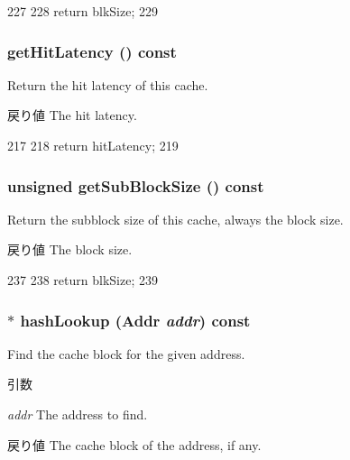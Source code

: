\begin{DoxyCode}
227     {
228         return blkSize;
229     }
\end{DoxyCode}
\hypertarget{classFALRU_a0239f3ef0ba6cf7c0460b12d289e6517}{
\subsubsection[{getHitLatency}]{ getHitLatency () const}}
\label{classFALRU_a0239f3ef0ba6cf7c0460b12d289e6517}
Return the hit latency of this cache. \begin{DoxyReturn}{戻り値}
The hit latency. 
\end{DoxyReturn}



\begin{DoxyCode}
217     {
218         return hitLatency;
219     }
\end{DoxyCode}
\hypertarget{classFALRU_aca3769c95ef908ce22475a69f8929a32}{
\subsubsection[{getSubBlockSize}]{\setlength{\rightskip}{0pt plus 5cm}unsigned getSubBlockSize () const}}
\label{classFALRU_aca3769c95ef908ce22475a69f8929a32}
Return the subblock size of this cache, always the block size. \begin{DoxyReturn}{戻り値}
The block size. 
\end{DoxyReturn}



\begin{DoxyCode}
237     {
238         return blkSize;
239     }
\end{DoxyCode}
\hypertarget{classFALRU_a55122befb6dfc11b5c81f04315531ee0}{
\subsubsection[{hashLookup}]{ $\ast$ hashLookup ({\bf Addr} {\em addr}) const}}
\label{classFALRU_a55122befb6dfc11b5c81f04315531ee0}
Find the cache block for the given address. 
\begin{DoxyParams}{引数}
\item[{\em addr}]The address to find. \end{DoxyParams}
\begin{DoxyReturn}{戻り値}
The cache block of the address, if any. 
\end{DoxyReturn}




